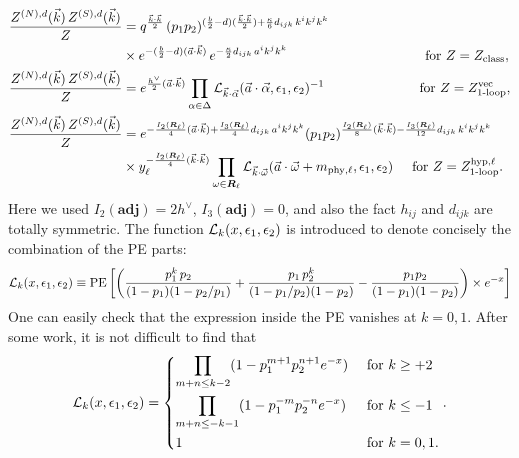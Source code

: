 \documentclass[letterpaper, 11pt]{article}
\newcommand{\nn}{\nonumber}
\def\CL{{\cal L}}
\def\a{\alpha}
\def\e{\epsilon}
\def\k{\kappa}
\def\w{\omega}
\def\D{\Delta}
\begin{document}
\begin{align}
  \frac{Z^{(N), d}(\vec{k}) \, Z^{(S), d}(\vec{k})}{Z}  &=  q^{\frac{\vec{k}\cdot\vec{k}}{2} } \, 
  (p_1p_2)^{(\frac{b}{2}-d) (\frac{\vec{k}\cdot\vec{k}}{2}) +\frac{\k}{6}d_{ijk}\,k^ik^jk^k} \nn\\&\times  e^{-(\frac{b}{2}-d)(\vec{a}\cdot\vec{k})}\,
  e^{-\frac{\kappa}{2}d_{ijk}\,a^ik^jk^k} \hspace{3.62cm} \text{for }Z=Z_\text{class},\\
  \frac{Z^{(N), d}(\vec{k}) \, Z^{(S), d}(\vec{k})}{Z} &= e^{\frac{h^\vee}{2}(\vec{a}\cdot\vec{k})}  \prod_{\a \in \D} \CL_{\vec{k} \cdot \vec{\a}} (\vec{a}\cdot\vec{\alpha}, \epsilon_1, \epsilon_2)^{-1}  \hspace{2.5cm} \text{for }Z=Z_\text{1-loop}^\text{vec}, \\
  \frac{Z^{(N), d}(\vec{k}) \, Z^{(S), d}(\vec{k})}{Z} &= e^{-\frac{I_2(\boldsymbol{R}_\ell)}{4}(\vec{a}\cdot\vec{k})+\frac{I_3(\boldsymbol{R}_\ell)}{4}d_{ijk}\,a^ik^jk^k} (p_1p_2)^{\frac{I_2(\boldsymbol{R}_\ell)}{8}(\vec{k}\cdot\vec{k})-\frac{I_3(\boldsymbol{R}_\ell)}{12}d_{ijk}\,k^ik^jk^k}\nn \\
   &\times   y_\ell^{-\frac{I_2(\boldsymbol{R}_\ell)}{4}(\vec{k}\cdot\vec{k})} \prod_{\w \in \boldsymbol{R}_\ell} \CL_{\vec{k}\cdot\vec{\w}}(\vec{a}\cdot \vec{\w} + m_{\text{phy},\ell}, \e_1,\e_2) \hspace{0.5cm} \text{for }Z=Z_\text{1-loop}^\text{hyp,$\ell$}.
\end{align}
Here we used $I_2(\textbf{adj}) = 2h^\vee$, $I_3(\textbf{adj})=0$, and also 
the fact $h_{ij}$ and $d_{ijk}$ are totally symmetric. The function $\CL_k (x,\e_1,\e_2)$ is introduced to denote concisely the combination of the PE parts:
\begin{align}
  \CL_k (x,\e_1,\e_2) \equiv \text{PE}\left[\left(\frac{p_1^k \, p_2}{(1-p_1)(1-p_2/p_1)}+\frac{p_1\, p_2^k}{(1-p_1/p_2)(1-p_2)}-\frac{p_1p_2}{(1-p_1)(1-p_2)}\right)\times e^{-x}\right]
\end{align}
One can easily check that the expression inside the PE vanishes at $k=0, 1$. After some work, it is not difficult to find that 
\begin{align}
  \CL_k (x,\e_1,\e_2) =
   \begin{dcases}
   \prod_{m+n \le k-2}(1-p_1^{m+1} p_2^{n+1}e^{-x}) & \text{ for } k\geq +2 \\
   \prod_{m+n \le -k-1}(1-p_1^{-m} p_2^{-n}e^{-x}) & \text{ for } k\leq-1 \\
   1 & \text{ for } k=0, 1.
   \end{dcases} . 
\end{align}
\end{document}
